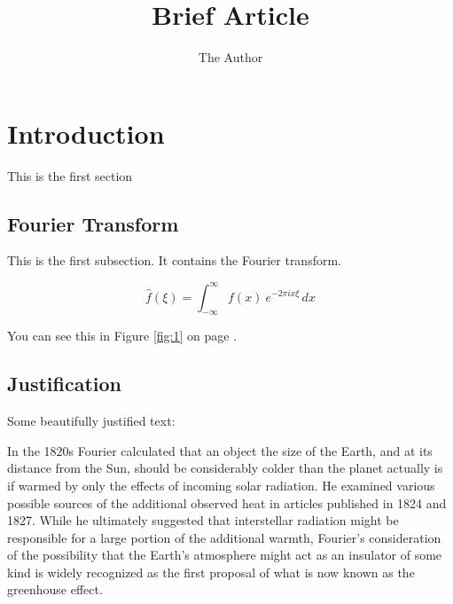 \documentclass[11pt]{article}
\title{Brief Article}
\author{The Author}
\begin{document}
\maketitle

\tableofcontents

\pagebreak

\section{Introduction}

This is the first section
\subsection{Fourier Transform}


This is the first subsection. It contains the Fourier transform\cite{bracewell1986fourier}.

\begin{equation}
\hat{f}(\xi) = \int_{-\infty}^\infty f(x)\ e^{- 2\pi i x \xi}\,dx
\end{equation}


You can see this in Figure \ref{fig:1} on page \pageref{fig:1}.
\pagebreak
\pagebreak
\pagebreak
\pagebreak
\subsection{Justification}

Some beautifully justified text\cite{laplace1995pierre}:

In the 1820s Fourier calculated\cite{hale1971functional} that an object the size of the Earth, and at its distance from the Sun, should be considerably colder than the planet actually is if warmed by only the effects of incoming solar radiation. He examined various possible sources of the additional observed heat in articles published in 1824 and 1827. While he ultimately suggested that interstellar radiation might be responsible for a large portion of the additional warmth, Fourier's consideration of the possibility that the Earth's atmosphere might act as an insulator of some kind is widely recognized as the first proposal of what is now known as the greenhouse effect.
\end{document}

